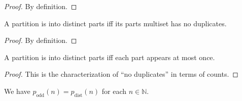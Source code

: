 \begin{proof}
\leanok
By definition.
\end{proof}

\begin{lemma}
\label{lem.pars.isDistinctParts-iff}
\leanhelper
\leanok
A partition is into distinct parts iff its parts multiset has no duplicates.
\end{lemma}

\begin{proof}
\leanok
By definition.
\end{proof}

\begin{lemma}
\label{lem.pars.isDistinctParts-iff-count}
\leanhelper
\leanok
A partition is into distinct parts iff each part appears at most once.
\end{lemma}

\begin{proof}
\leanok
This is the characterization of ``no duplicates'' in terms of counts.
\end{proof}

\begin{theorem}
\label{thm.pars.odd-dist-equal}
\leantarget
\leanok
We have
$p_{\operatorname{odd}}\left(  n\right)  =p_{\operatorname{dist}}\left(
n\right)  $ for each $n\in\mathbb{N}$.
\end{theorem}

